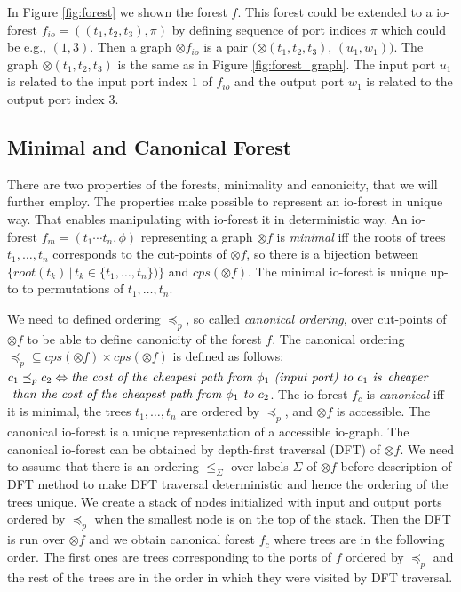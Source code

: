 In Figure \ref{fig:forest} we shown the forest $f$.
This forest could be extended to a io-forest $f_{io}=((t_1,t_2,t_3),\pi)$ by defining sequence of port indices $\pi$
which could be e.g., $(1,3)$.
Then a graph $\otimes f_{io}$ is a pair $(\otimes (t_1,t_2,t_3)$, $(u_1,w_1))$.
The graph $\otimes (t_1,t_2,t_3)$ is the same as in Figure \ref{fig:forest_graph}.
The input port $u_1$ is related to the input port index $1$ of $f_{io}$
and the output port $w_1$ is related to the output port index $3$.
\label{ex:iograph}
\eexmp

\subsection{Minimal and Canonical Forest}
\label{subsec:mcforest}

There are two properties of the forests, minimality and canonicity, that we will further employ.
The properties make possible to represent an io-forest in unique way.
That enables manipulating with io-forest it in deterministic way.
An io-forest $f_m=(t_1 \cdots t_n, \phi)$ representing a graph $\otimes f$ is \emph{minimal}
iff the roots of trees $t_1,\ldots,t_n$ corresponds to the cut-points of $\otimes f$,
so there is a bijection between $\{root(t_k)\,|\, t_k \in \{t_1, \ldots, t_n\} )\}$ and $cps(\otimes f)$.
The minimal io-forest is unique up-to to permutations of $t_1,\ldots,t_n$.

We need to defined ordering $\preceq_p$, so called \emph{canonical ordering}, over cut-points of $\otimes f$ to be able to define canonicity of the forest $f$.
The canonical ordering $\preceq_p \subseteq cps(\otimes f) \times cps(\otimes f)$ is defined as follows: $c_1 \preceq_p c_2 \Leftrightarrow \emph{the cost of the cheapest path from }
\phi_1 \emph{ (input port) to } c_1 \emph{ is}$ $\emph{cheaper}$ $\emph{ than the cost of the cheapest path from } \phi_1 \emph{ to } c_2$.
The io-forest $f_c$ is \emph{canonical} iff it is minimal, the trees $t_1,\ldots, t_n$ are ordered by $\preceq_p$, and $\otimes f$ is accessible.
The canonical io-forest is a unique representation of a accessible io-graph.
The canonical io-forest can be obtained by depth-first traversal (DFT)\cite{taocp} of $\otimes f$.
We need to assume that there is an ordering $\leq_\Sigma$ over labels $\Sigma$ of $\otimes f$ before description of DFT method to
make DFT traversal deterministic and hence the ordering of the trees unique.
We create a stack of nodes initialized with input and output ports ordered by $\preceq_p$ when the smallest node is on the top of the stack.
Then the DFT is run over $\otimes f$ and we obtain canonical forest $f_c$ where trees are in the following order.
The first ones are trees corresponding to the ports of $f$ ordered by $\preceq_p$ and the rest of the trees are in the order
in which they were visited by DFT traversal.


